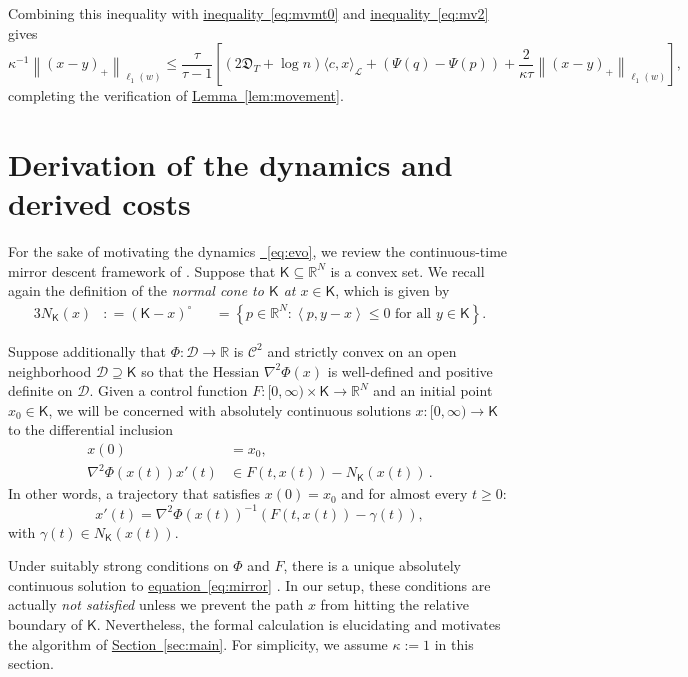 \documentclass[11pt]{article}
\numberwithin{equation}{section}
\theoremstyle{definition}
\theoremstyle{plain}
\newcommand{\R}{\mathbb R}
\newcommand{\expref}[2]{\hyperref[#2]{#1~\ref{#2}}}
\newcommand{\expeqref}[2]{\hyperref[#2]{#1~\eqref{#2}}}
\newcommand{\calC}{\mathcal C}
\newcommand{\calD}{\mathcal D}
\newcommand{\calL}{\mathcal L}
\newcommand{\depth}{\mathfrak{D}}
\newcommand{\seteq}{\mathrel{\mathop:}=}
\newcommand{\sfK}{\mathsf K}
\newcommand{\llangle}{\left\langle}
\newcommand{\rrangle}{\right\rangle}
\begin{document}
Combining this inequality with \expeqref{inequality}{eq:mvmt0} and \expeqref{inequality}{eq:mv2} gives
\begin{equation}\label{eq:mvmt3}
\kappa^{-1} \left\|\left(x-y\right)_+\right\|_{\ell_1(w)} 
\leq \frac{\tau}{\tau-1}\left[
\left(2\depth_T + \log n\right) \langle c,x\rangle_{\calL} + \left(\Psi(q)-\Psi(p)\right) 
+ \frac{2}{\kappa\tau} \left\|\left(x-y\right)_+\right\|_{\ell_1(w)}\right],
\end{equation}
completing the verification of \expref{Lemma}{lem:movement}.



\section{Derivation of the dynamics and derived costs}
\label{sec:derivation}


For the sake of motivating the dynamics \expeqref{\!}{eq:evo}, we review the
continuous-time mirror descent framework of \cite{BCLLM18}.
Suppose that $\sfK \subseteq \R^N$ is a convex set.
We recall again the definition of the \emph{normal cone to 
	$\sfK$ at $x \in \sfK$}, which is given by
\begin{alignat*}{3}
N_{\sfK}(x) &\seteq (\sfK-x)^{\circ} &&= \left\{ p \in \R^N : \llangle p,y-x\rrangle \leq 0 \textrm{ for all } y \in \sfK\right\}.
\end{alignat*}

Suppose additionally that $\Phi : \calD \to \R$
is $\calC^2$ and strictly convex on an open neighborhood $\calD \supseteq \sfK$ so that
the Hessian $\nabla^2 \Phi(x)$ is well-defined and positive definite on $\calD$.
Given a control function $F : [0,\infty) \times \sfK \to \R^N$ and an initial point $x_0 \in \sfK$, we will be concerned
with absolutely continuous solutions $x : [0,\infty) \to \sfK$ to the differential inclusion
\begin{align*}
x(0) &= x_0, \\
\nabla^2 \Phi(x(t)) x'(t) &\in F(t,x(t)) - N_{\sfK}(x(t))\,.
\end{align*}
In other words, a trajectory that satisfies $x(0) = x_0$ and
for almost every $t \geq 0$:
\begin{equation}\label{eq:mirror}
x'(t) = \nabla^2 \Phi(x(t))^{-1} \left(F(t,x(t)) - \gamma(t)\right),
\end{equation}
with $\gamma(t) \in N_{\sfK}(x(t))$.

Under suitably strong conditions on $\Phi$ and $F$, there is a unique absolutely continuous
solution to \expeqref{equation}{eq:mirror} \cite{BCLLM18}.
In our setup, these conditions are actually \emph{not satisfied} unless we prevent the path $x$ from hitting the relative boundary of $\sfK$.
Nevertheless, the formal calculation is elucidating and motivates the algorithm of \expref{Section}{sec:main}. For simplicity, we assume $\kappa:=1$ in this section.
\end{document}
